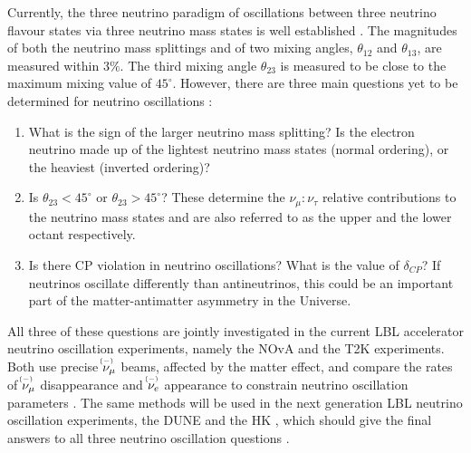 Currently, the three neutrino paradigm of oscillations between three neutrino flavour states via three neutrino mass states is well established \cite{PDG.pdf, NuOscGlobalFit2020.pdf}. The magnitudes of both the neutrino mass splittings and of two mixing angles, $\theta_{12}$ and $\theta_{13}$, are measured within $3\%$. The third mixing angle $\theta_{23}$ is measured to be close to the maximum mixing value of $45^{\circ}$. However, there are three main questions yet to be determined for neutrino oscillations \cite{SnowmassNeutrinoFrontierReport.pdf}:
\begin{enumerate}
\item What is the sign of the larger neutrino mass splitting? Is the electron neutrino made up of the lightest neutrino mass states (normal ordering), or the heaviest (inverted ordering)?
\item Is $\theta_{23}<45^{\circ}$ or $\theta_{23}>45^{\circ}$? These determine the $\nu_\mu : \nu_\tau$ relative contributions to the neutrino mass states and are also referred to as the upper and the lower octant respectively.
\item Is there \gls{CP} violation in neutrino oscillations? What is the value of $\delta_{CP}$? If neutrinos oscillate differently than antineutrinos, this could be an important part of the matter-antimatter asymmetry in the Universe.
\end{enumerate}
All three of these questions are jointly investigated in the current \gls{LBL} accelerator neutrino oscillation experiments, namely the \gls{NOvA} \cite{NOvAResults2021.pdf} and the \gls{T2K} \cite{T2KOscResults2023.pdf} experiments. Both use precise $\accentset{(-)}{\nu}_\mu$ beams, affected by the matter effect, and compare the rates of
$\accentset{(-)}{\nu}_\mu$ disappearance and $\accentset{(-)}{\nu}_e$ appearance to constrain neutrino oscillation parameters \cite{SnowmassNeutrinoFrontierReport.pdf}. The same methods will be used in the next generation \gls{LBL} neutrino oscillation experiments, the \gls{DUNE} \cite{IntroductionToDUNE2020.pdf} and the \gls{HK} \cite{HyperKTDR2018.pdf}, which should give the final answers to all three neutrino oscillation questions \cite{SnowmassNeutrinoFrontierReport.pdf}.
 


